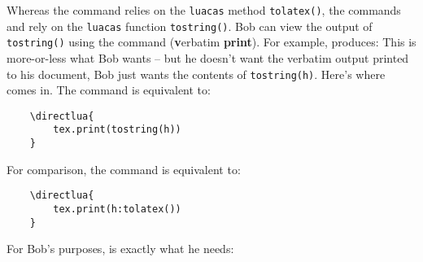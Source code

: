 \documentclass{article}
\begin{document}
Whereas the \texttt{\print} command relies on the \texttt{luacas} method \texttt{tolatex()}, the commands \texttt{\fetch} and \texttt{\store} rely on the \texttt{luacas} function \texttt{tostring()}. Bob can view the output of \texttt{tostring()} using the \texttt{\vprint} command ({\bf v}erbatim {\bf print}). For example, \texttt{} produces:
This is more-or-less what Bob wants -- but he doesn't want the verbatim output printed to his document, Bob just wants the contents of \texttt{tostring(h)}. Here's where \texttt{\fetch} comes in. The command \texttt{} is equivalent to:
\begin{verbatim}
    \directlua{
        tex.print(tostring(h))
    }
\end{verbatim}
For comparison, the command \texttt{} is equivalent to:
\begin{verbatim}
    \directlua{
        tex.print(h:tolatex())
    }
\end{verbatim}
For Bob's purposes, \texttt{} is exactly what he needs:
\end{document}
